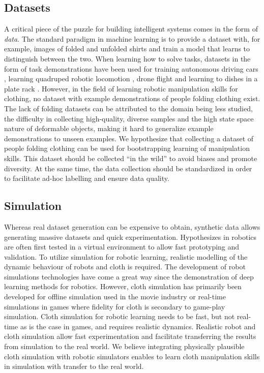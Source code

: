 \documentclass[\home/main.tex]{subfiles}
\begin{document}
\subsection{Datasets}
A critical piece of the puzzle for building intelligent systems comes in the form of \emph{data}. The standard paradigm in machine learning is to provide a dataset with, for example, images of folded and unfolded shirts and train a model that learns to distinguish between the two. When learning how to solve tasks, datasets in the form of task demonstrations have been used for training autonomous driving cars \autocite{bojarski2016end}, learning quadruped robotic locomotion \autocite{peng2020learning}, drone flight \autocite{Giusti2016} and learning to dishes in a plate rack \autocite{Finn2016}. However, in the field of learning robotic manipulation skills for clothing, no dataset with example demonstrations of people folding clothing exist. The lack of folding datasets can be attributed to the domain being less studied, the difficulty in collecting high-quality, diverse samples and the high state space nature of deformable objects, making it hard to generalize example demonstrations to unseen examples. We hypothesize that collecting a dataset of people folding clothing can be used for bootstrapping learning of manipulation skills. This dataset should be collected \enquote{in the wild} to avoid biases and promote diversity. At the same time, the data collection should be standardized in order to facilitate ad-hoc labelling and ensure data quality.

\subsection{Simulation}
Whereas real dataset generation can be expensive to obtain, synthetic data allows generating massive datasets and quick experimentation. Hypothesizes in robotics are often first tested in a virtual environment to allow fast prototyping and validation. To utilize simulation for robotic learning, realistic modelling of the dynamic behaviour of robots and cloth is required. The development of robot simulations technologies have come a great way since the demonstration of deep learning methods for robotics. However, cloth simulation has primarily been developed for offline simulation used in the movie industry or real-time simulations in games where fidelity for cloth is secondary to game-play simulation. Cloth simulation for robotic learning needs to be fast, but not real-time as is the case in games, and requires realistic dynamics. Realistic robot and cloth simulation allow fast experimentation and facilitate transferring the results from simulation to the real world. We believe integrating physically plausible cloth simulation with robotic simulators enables to learn cloth manipulation skills in simulation with transfer to the real world. 
\end{document}

